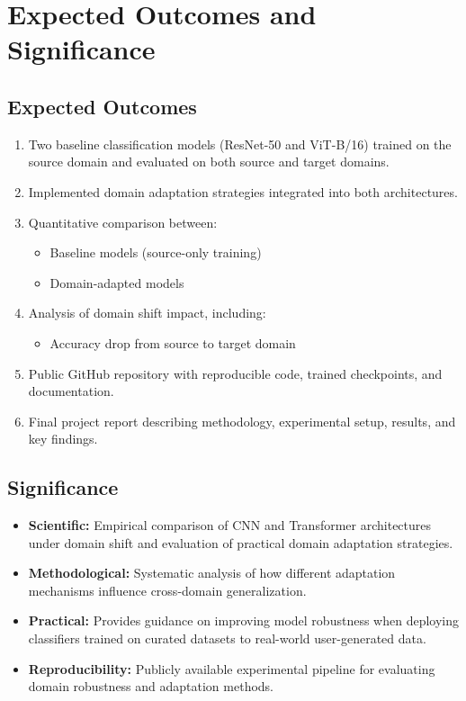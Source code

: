 \documentclass[a4paper,12pt]{extarticle}
\begin{document}
\section{Expected Outcomes and Significance}
\label{sec:expected}

\subsection{Expected Outcomes}
\begin{enumerate}
	\item Two baseline classification models (ResNet-50 and ViT-B/16) trained on the source domain and evaluated on both source
	      and target domains.

	\item Implemented domain adaptation strategies integrated into both architectures.

	\item Quantitative comparison between:
	      \begin{itemize}
		      \item Baseline models (source-only training)
		      \item Domain-adapted models
	      \end{itemize}

	\item Analysis of domain shift impact, including:
	      \begin{itemize}
		      \item Accuracy drop from source to target domain
	      \end{itemize}

	\item Public GitHub repository with reproducible code, trained checkpoints, and documentation.

	\item Final project report describing methodology, experimental setup, results, and key findings.
\end{enumerate}

\subsection{Significance}
\begin{itemize}
	\item \textbf{Scientific:} Empirical comparison of CNN and Transformer architectures under domain shift and evaluation of practical domain adaptation strategies.
	\item \textbf{Methodological:} Systematic analysis of how different adaptation mechanisms influence cross-domain generalization.
	\item \textbf{Practical:} Provides guidance on improving model robustness when deploying classifiers trained on curated datasets to real-world user-generated data.
	\item \textbf{Reproducibility:} Publicly available experimental pipeline for evaluating domain robustness and adaptation methods.
\end{itemize}
\end{document}
